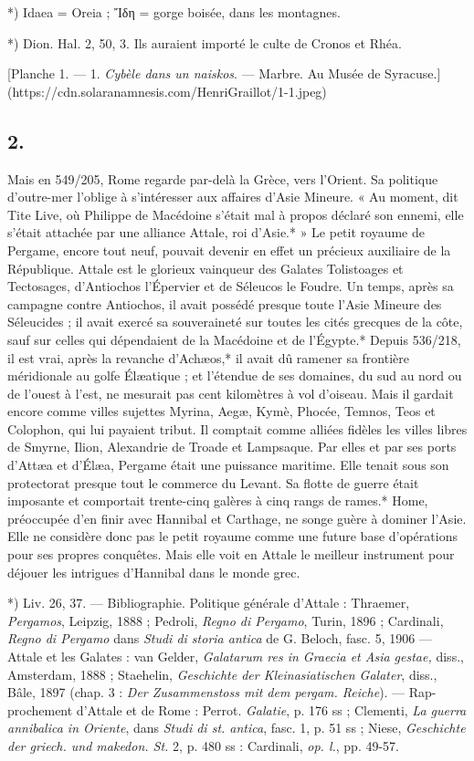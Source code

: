 \documentclass[a4paper, 11pt, oneside, polutonikogreek, french]{article}
\begin{document}
*) Idaea = Oreia ; Ἴδη = gorge boisée, dans les montagnes.

*) Dion. Hal. 2, 50, 3. Ils auraient importé le culte de Cronos et Rhéa.

[Planche 1. --- 1. \emph{Cybèle dans un naiskos}. --- Marbre. Au Musée de Syracuse.](https://cdn.solaranamnesis.com/HenriGraillot/1-1.jpeg)

\subsection{2.}

Mais en 549/205, Rome regarde par-delà la Grèce, vers l'Orient. Sa politique d'outre-mer l'oblige à s'intéresser aux affaires d'Asie Mineure. « Au moment, dit Tite Live, où Philippe de Macédoine s'était mal à propos déclaré son ennemi, elle s'était attachée par une alliance Attale, roi d'Asie.* » Le petit royaume de Pergame, encore tout neuf, pouvait devenir en effet un précieux auxiliaire de la République. Attale est le glorieux vainqueur des Galates Tolistoages et Tectosages, d'Antiochos l'Épervier et de Séleucos le Foudre. Un temps, après sa campagne contre Antiochos, il avait possédé presque toute l'Asie Mineure des Séleucides ; il avait exercé sa souveraineté sur toutes les cités grecques de la côte, sauf sur celles qui dépendaient de la Macédoine et de l'Égypte.* Depuis 536/218, il est vrai, après la revanche d'Achæos,* il avait dû ramener sa frontière méridionale au golfe Élæatique ; et l'étendue de ses domaines, du sud au nord ou de l'ouest à l'est, ne mesurait pas cent kilomètres à vol d'oiseau. Mais il gardait encore comme villes sujettes Myrina, Aegæ, Kymè, Phocée, Temnos, Teos et Colophon, qui lui payaient tribut. Il comptait comme alliées fidèles les villes libres de Smyrne, Ilion, Alexandrie de Troade et Lampsaque. Par elles et par ses ports d'Attæa et d'Élæa, Pergame était une puissance maritime. Elle tenait sous son protectorat presque tout le commerce du Levant. Sa flotte de guerre était imposante et comportait trente-cinq galères à cinq rangs de rames.* Home, préoccupée d'en finir avec Hannibal et Carthage, ne songe guère à dominer l'Asie. Elle ne considère donc pas le petit royaume comme une future base d'opérations pour ses propres conquêtes. Mais elle voit en Attale le meilleur instrument pour déjouer les intrigues d'Hannibal dans le monde grec.

*) Liv. 26, 37. --- Bibliographie. Politique générale d'Attale : Thraemer, \emph{Pergamos}, Leipzig, 1888 ; Pedroli, \emph{Regno di Pergamo}, Turin, 1896 ; Cardinali, \emph{Regno di Pergamo} dans \emph{Studi di storia antica} de G. Beloch, fasc. 5, 1906 --- Attale et les Galates : van Gelder, \emph{Galatarum res in Graecia et Asia gestae,} diss., Amsterdam, 1888 ; Staehelin, \emph{Geschichte der Kleinasiatischen Galater}, diss., Bâle, 1897 (chap. 3 : \emph{Der Zusammenstoss mit dem pergam. Reiche}). --- Rap- prochement d'Attale et de Rome : Perrot. \emph{Galatie}, p. 176 ss ; Clementi, \emph{La guerra annibalica in Oriente}, dans \emph{Studi di st. antica}, fasc. 1, p. 51 ss ; Niese, \emph{Geschichte der griech. und makedon. St.} 2, p. 480 ss : Cardinali, \emph{op. l.}, pp. 49-57.
\end{document}
